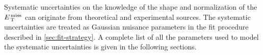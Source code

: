 Systematic uncertainties on the knowledge of the shape and normalization of the
$E_\mathrm{\, T}^\mathrm{\, miss}$ can originate from theoretical and experimental sources. The systematic
uncertainties are treated as Gaussian nuisance parameters in the fit procedure
described in \cref{sec:fit-strategy}. A complete list of all the parameters used
to model the systematic uncertainties is given in the following sections.
